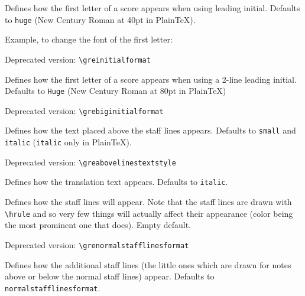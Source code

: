 Defines how the first letter of a score appears when using leading
initial.  Defaults to \verb=huge= (New Century Roman at 40pt in
Plain\TeX).

Example, to change the font of the first letter:

\begin{latexcode}
  \renewenvironment*{initialformat}{\fontfamily{ppl}\selectfont\huge}{}
\end{latexcode}

\smallskip\hspace{15pt} Deprecated version: \verb=\greinitialformat=

Defines how the first letter of a score appears when using a 2-line
leading initial.  Defaults to \verb=Huge= (New Century Roman at 80pt
in Plain\TeX)

\smallskip\hspace{15pt} Deprecated version: \verb=\grebiginitialformat=

Defines how the text placed above the staff lines appears.  Defaults
to \verb=small= and \verb=italic= (\verb=italic= only in Plain\TeX).

\smallskip\hspace{15pt} Deprecated version: \verb=\greabovelinestextstyle=

Defines how the translation text appears.  Defaults to \verb=italic=.

Defines how the staff lines will appear.  Note that the staff lines
are drawn with \verb=\hrule= and so very few things will actually
affect their appearance (color being the most prominent one that
does).  Empty default.

\smallskip\hspace{15pt} Deprecated version: \verb=\grenormalstafflinesformat=

Defines how the additional staff lines (the little ones which are
drawn for notes above or below the normal staff lines) appear.
Defaults to \verb=normalstafflinesformat=.

